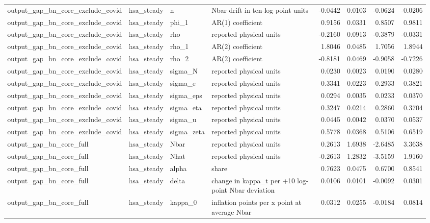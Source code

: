 \begin{tabular}{llllrrrr}
output\_gap\_bn\_core\_exclude\_covid & hsa\_steady & n & Nbar drift in ten-log-point units & -0.0442 & 0.0103 & -0.0624 & -0.0206 \\
output\_gap\_bn\_core\_exclude\_covid & hsa\_steady & phi\_1 & AR(1) coefficient & 0.9156 & 0.0331 & 0.8507 & 0.9811 \\
output\_gap\_bn\_core\_exclude\_covid & hsa\_steady & rho & reported physical units & -0.2160 & 0.0913 & -0.3879 & -0.0331 \\
output\_gap\_bn\_core\_exclude\_covid & hsa\_steady & rho\_1 & AR(2) coefficient & 1.8046 & 0.0485 & 1.7056 & 1.8944 \\
output\_gap\_bn\_core\_exclude\_covid & hsa\_steady & rho\_2 & AR(2) coefficient & -0.8181 & 0.0469 & -0.9058 & -0.7226 \\
output\_gap\_bn\_core\_exclude\_covid & hsa\_steady & sigma\_N & reported physical units & 0.0230 & 0.0023 & 0.0190 & 0.0280 \\
output\_gap\_bn\_core\_exclude\_covid & hsa\_steady & sigma\_e & reported physical units & 0.3341 & 0.0223 & 0.2933 & 0.3821 \\
output\_gap\_bn\_core\_exclude\_covid & hsa\_steady & sigma\_eps & reported physical units & 0.0294 & 0.0035 & 0.0233 & 0.0370 \\
output\_gap\_bn\_core\_exclude\_covid & hsa\_steady & sigma\_eta & reported physical units & 0.3247 & 0.0214 & 0.2860 & 0.3704 \\
output\_gap\_bn\_core\_exclude\_covid & hsa\_steady & sigma\_u & reported physical units & 0.0445 & 0.0042 & 0.0370 & 0.0537 \\
output\_gap\_bn\_core\_exclude\_covid & hsa\_steady & sigma\_zeta & reported physical units & 0.5778 & 0.0368 & 0.5106 & 0.6519 \\
output\_gap\_bn\_core\_full & hsa\_steady & Nbar & reported physical units & 0.2613 & 1.6938 & -2.6485 & 3.3638 \\
output\_gap\_bn\_core\_full & hsa\_steady & Nhat & reported physical units & -0.2613 & 1.2832 & -3.5159 & 1.9160 \\
output\_gap\_bn\_core\_full & hsa\_steady & alpha & share & 0.7623 & 0.0475 & 0.6700 & 0.8541 \\
output\_gap\_bn\_core\_full & hsa\_steady & delta & change in kappa\_t per +10 log-point Nbar deviation & 0.0106 & 0.0101 & -0.0092 & 0.0301 \\
output\_gap\_bn\_core\_full & hsa\_steady & kappa\_0 & inflation points per x point at average Nbar & 0.0312 & 0.0255 & -0.0184 & 0.0814 \\

\end{tabular}
